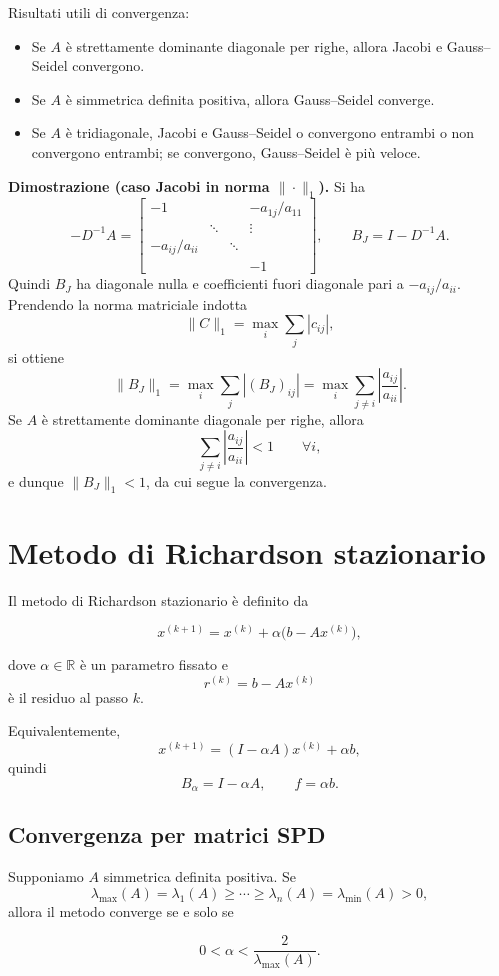 \documentclass[11pt,a4paper]{report}
\newcommand{\R}{\mathbb{R}}
\begin{document}
Risultati utili di convergenza:
\begin{itemize}
  \item Se $A$ \`e strettamente dominante diagonale per righe, allora Jacobi e Gauss--Seidel convergono.
  \item Se $A$ \`e simmetrica definita positiva, allora Gauss--Seidel converge.
  \item Se $A$ \`e tridiagonale, Jacobi e Gauss--Seidel o convergono entrambi o non convergono entrambi; se convergono, Gauss--Seidel \`e pi\`u veloce.
\end{itemize}

\begin{nonExamBox}
\textbf{Dimostrazione (caso Jacobi in norma $\|\cdot\|_1$).}
Si ha
\[
-D^{-1}A=
\begin{bmatrix}
-1 &        &        & -a_{1j}/a_{11} \\
   & \ddots &        & \vdots \\
-a_{ij}/a_{ii} & & \ddots & \\
   &        &        & -1
\end{bmatrix},
\qquad
B_J=I-D^{-1}A.
\]
Quindi $B_J$ ha diagonale nulla e coefficienti fuori diagonale pari a $-a_{ij}/a_{ii}$.
Prendendo la norma matriciale indotta
\[
\|C\|_1=\max_i \sum_j |c_{ij}|,
\]
si ottiene
\[
\|B_J\|_1=\max_i \sum_j |(B_J)_{ij}|
       =\max_i \sum_{j\neq i}\left|\frac{a_{ij}}{a_{ii}}\right|.
\]
Se $A$ \`e strettamente dominante diagonale per righe, allora
\[
\sum_{j\neq i}\left|\frac{a_{ij}}{a_{ii}}\right|<1
\qquad \forall i,
\]
e dunque $\|B_J\|_1<1$, da cui segue la convergenza.
\end{nonExamBox}

\section{Metodo di Richardson stazionario}
Il metodo di Richardson stazionario \`e definito da
\begin{formulaBox}
\[
 x^{(k+1)}=x^{(k)}+\alpha\bigl(b-Ax^{(k)}\bigr),
\]
\end{formulaBox}
dove $\alpha\in\R$ \`e un parametro fissato e
\[
 r^{(k)}=b-Ax^{(k)}
\]
\`e il residuo al passo $k$.

Equivalentemente,
\[
 x^{(k+1)}=(I-\alpha A)x^{(k)}+\alpha b,
\]
quindi
\[
 B_\alpha=I-\alpha A,
\qquad
f=\alpha b.
\]

\subsection{Convergenza per matrici SPD}
Supponiamo $A$ simmetrica definita positiva. Se
\[
\lambda_{\max}(A)=\lambda_1(A)\ge \cdots \ge \lambda_n(A)=\lambda_{\min}(A)>0,
\]
allora il metodo converge se e solo se
\begin{formulaBox}
\[
0<\alpha<\frac{2}{\lambda_{\max}(A)}.
\]
\end{formulaBox}
\end{document}
